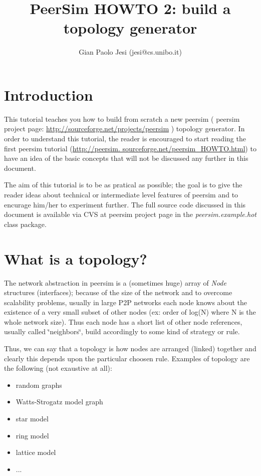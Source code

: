 \documentclass[a4paper,12pt]{article}
\title{PeerSim HOWTO 2: build a topology generator}
\author{Gian Paolo Jesi (jesi@cs.unibo.it)}
\begin{document}
\maketitle

\section{Introduction}



This tutorial teaches you how to build from scratch a new peersim
( peersim project page: \url{http://sourceforge.net/projects/peersim}
) topology generator. In order to understand this tutorial, the reader
is encouraged to start reading the first peersim tutorial 
(\url{http://peersim. sourceforge.net/peersim_HOWTO.html}) 
to have an idea of the basic concepts that will not be discussed any
further in this document. 

The aim of this tutorial is to be as pratical as possible; the goal
is to give the reader ideas about technical or intermediate level
features of peersim and to encurage him/her to experiment further.
The full source code discussed in this document is available via CVS
at peersim project page in the \emph{peersim.example.hot} class package.


\section{What is a topology?}

The network abstraction in peersim is a (sometimes huge) array of
\emph{Node} structures (interfaces); because of the size of the network
and to overcome scalability problems, usually in large P2P networks
each node knows about the existence of a very small subset of other
nodes (ex: order of log(N) where N is the whole network size). Thus
each node has a short list of other node references, usually called
\char`\"{}neighbors\char`\"{}, build accordingly to some kind of strategy
or rule. 

Thus, we can say that a topology is how nodes are arranged (linked)
together and clearly this depends upon the particular choosen rule.
Examples of topology are the following (not exaustive at all): 

\begin{itemize}
\item random graphs 
\item Watts-Strogatz model graph 
\item star model 
\item ring model 
\item lattice model 
\item ...
\end{itemize}
\end{document}
